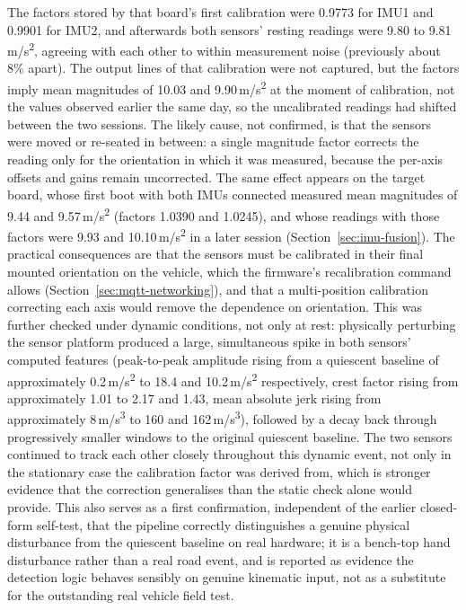 The factors stored by that board's first calibration were 0.9773 for IMU1 and 0.9901 for IMU2, and afterwards both sensors' resting readings were 9.80 to 9.81\,m/s\textsuperscript{2}, agreeing with each other to within measurement noise (previously about 8\% apart). The output lines of that calibration were not captured, but the factors imply mean magnitudes of 10.03 and 9.90\,m/s\textsuperscript{2} at the moment of calibration, not the values observed earlier the same day, so the uncalibrated readings had shifted between the two sessions. The likely cause, not confirmed, is that the sensors were moved or re-seated in between: a single magnitude factor corrects the reading only for the orientation in which it was measured, because the per-axis offsets and gains remain uncorrected. The same effect appears on the target board, whose first boot with both IMUs connected measured mean magnitudes of 9.44 and 9.57\,m/s\textsuperscript{2} (factors 1.0390 and 1.0245), and whose readings with those factors were 9.93 and 10.10\,m/s\textsuperscript{2} in a later session (Section~\ref{sec:imu-fusion}). The practical consequences are that the sensors must be calibrated in their final mounted orientation on the vehicle, which the firmware's recalibration command allows (Section~\ref{sec:mqtt-networking}), and that a multi-position calibration correcting each axis would remove the dependence on orientation. This was further checked under dynamic conditions, not only at rest: physically perturbing the sensor platform produced a large, simultaneous spike in both sensors' computed features (peak-to-peak amplitude rising from a quiescent baseline of approximately 0.2\,m/s\textsuperscript{2} to 18.4 and 10.2\,m/s\textsuperscript{2} respectively, crest factor rising from approximately 1.01 to 2.17 and 1.43, mean absolute jerk rising from approximately 8\,m/s\textsuperscript{3} to 160 and 162\,m/s\textsuperscript{3}), followed by a decay back through progressively smaller windows to the original quiescent baseline. The two sensors continued to track each other closely throughout this dynamic event, not only in the stationary case the calibration factor was derived from, which is stronger evidence that the correction generalises than the static check alone would provide. This also serves as a first confirmation, independent of the earlier closed-form self-test, that the pipeline correctly distinguishes a genuine physical disturbance from the quiescent baseline on real hardware; it is a bench-top hand disturbance rather than a real road event, and is reported as evidence the detection logic behaves sensibly on genuine kinematic input, not as a substitute for the outstanding real vehicle field test.

